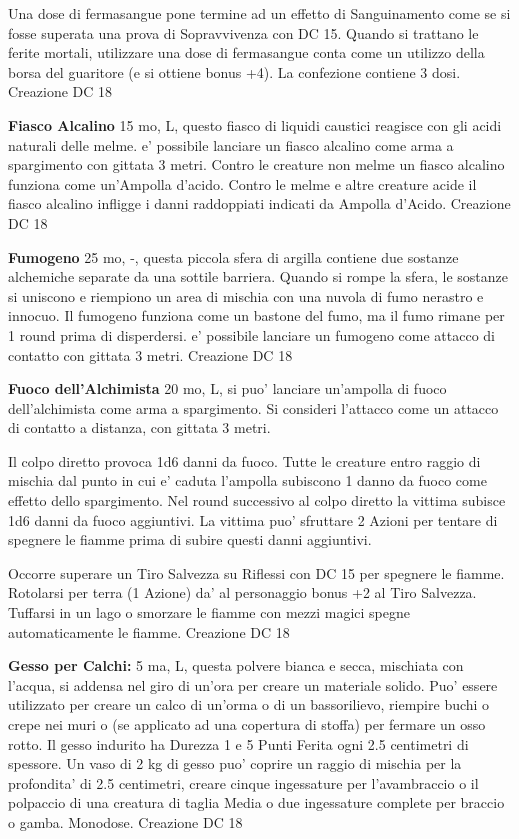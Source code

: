\documentclass[a4paper,11pt,twoside,openany]{book}
\begin{document}
{		Una dose di fermasangue pone termine ad un effetto di Sanguinamento come se si fosse superata una prova di Sopravvivenza con DC 15. Quando si trattano le ferite mortali, utilizzare una dose di fermasangue conta come un utilizzo della borsa del guaritore (e si ottiene bonus +4). La confezione contiene 3 dosi. Creazione DC 18
		
		\textbf{Fiasco Alcalino} 15 mo, L, questo fiasco di liquidi caustici reagisce con gli acidi naturali delle melme. e' possibile lanciare un fiasco alcalino come arma a spargimento con gittata 3 metri. Contro le creature non melme un fiasco alcalino funziona come un'Ampolla d'acido. Contro le melme e altre creature acide il fiasco alcalino infligge i danni raddoppiati indicati da Ampolla d'Acido. Creazione DC 18
		
		\textbf{Fumogeno} 25 mo, -, questa piccola sfera di argilla contiene due sostanze alchemiche separate da una sottile barriera. Quando si rompe la sfera, le sostanze si uniscono e riempiono un area di mischia con una nuvola di fumo nerastro e innocuo. Il fumogeno funziona come un bastone del fumo, ma il fumo rimane per 1 round prima di disperdersi. e' possibile lanciare un fumogeno come attacco di contatto con gittata 3 metri. Creazione DC 18
		
		\textbf{Fuoco dell'Alchimista} 20 mo, L, si puo' lanciare un'ampolla di fuoco dell'alchimista come arma a spargimento. Si consideri l'attacco come un attacco di contatto a distanza, con gittata 3 metri.
		
		Il colpo diretto provoca 1d6 danni da fuoco. Tutte le creature entro raggio di mischia dal punto in cui e' caduta l'ampolla subiscono 1 danno da fuoco come effetto dello spargimento. Nel round successivo al colpo diretto la vittima subisce 1d6 danni da fuoco aggiuntivi. La vittima puo' sfruttare 2 Azioni per tentare di spegnere le fiamme prima di subire questi danni aggiuntivi. 
		
		Occorre superare un Tiro Salvezza su Riflessi con DC 15 per spegnere le fiamme. Rotolarsi per terra (1 Azione) da' al personaggio bonus +2 al Tiro Salvezza. Tuffarsi in un lago o smorzare le fiamme con mezzi magici spegne automaticamente le fiamme. Creazione DC 18
		
		\textbf{Gesso per Calchi:} 5 ma, L, questa polvere bianca e secca, mischiata con l’acqua, si addensa nel giro di un’ora per creare un materiale solido. Puo' essere utilizzato per creare un calco di un’orma o di un bassorilievo, riempire buchi o crepe nei muri o (se applicato ad una copertura di stoffa) per fermare un osso rotto. Il gesso indurito ha Durezza 1 e 5 Punti Ferita ogni 2.5 centimetri di spessore. Un vaso di 2 kg di gesso puo' coprire un raggio di mischia per la profondita' di 2.5 centimetri, creare cinque ingessature per l’avambraccio o il polpaccio di una creatura di taglia Media o due ingessature complete per braccio o gamba. Monodose. Creazione DC 18
		
}
\end{document}
